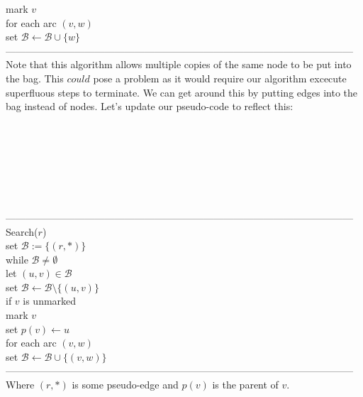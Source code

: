 \documentclass{article}
\newcommand{\emp}{\emptyset}
\newcommand{\mcal}[1]{\mathcal{#1}}
\begin{document}
	\hspace*{28mm} mark $v$\\
	\hspace*{28mm} for each arc $(v, w)$\\
	\hspace*{35mm} set $\mcal{B} \leftarrow \mcal{B} \cup \{w\}$\\
---------------------------------------------------------------------------------------------------------\\
Note that this algorithm allows multiple copies of the same node to be put into the bag. This $could$ pose a problem as it would require our algorithm excecute superfluous steps to terminate. We can get around this by putting edges into the bag instead of nodes. Let's update our pseudo-code to reflect this:\\\\\\\\\\\\\\\\
---------------------------------------------------------------------------------------------------------
Search($r$)\\
	\hspace*{7mm} set $\mcal{B} := \{(r, *)\}$\\
	\hspace*{14mm} while $\mcal{B} \neq \emp$\\
	\hspace*{21mm} let $(u, v) \in \mcal{B}$\\
	\hspace*{21mm} set $\mcal{B} \leftarrow \mcal{B} \setminus \{(u, v)\}$\\
	\hspace*{21mm} if $v$ is unmarked\\
	\hspace*{28mm} mark $v$\\
	\hspace*{28mm} set $p(v) \leftarrow u$\\
	\hspace*{28mm} for each arc $(v, w)$\\
	\hspace*{35mm} set $\mcal{B} \leftarrow \mcal{B} \cup \{(v, w)\}$\\
---------------------------------------------------------------------------------------------------------\\
Where $(r, *)$ is some pseudo-edge and $p(v)$ is the parent of $v$.
\end{document}
